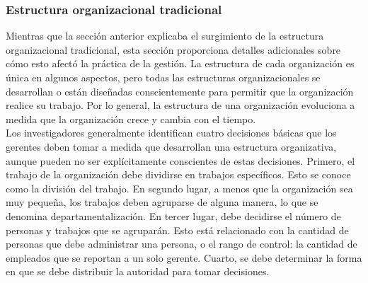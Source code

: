 \documentclass[10pt]{book}
\begin{document}
\subsubsection{Estructura organizacional tradicional}
Mientras que la sección anterior explicaba el surgimiento de la estructura organizacional tradicional, esta sección proporciona detalles adicionales sobre cómo esto afectó la práctica de la gestión. La estructura de cada organización es única en algunos aspectos, pero todas las estructuras organizacionales se desarrollan o están diseñadas conscientemente para permitir que la organización realice su trabajo. Por lo general, la estructura de una organización evoluciona a medida que la organización crece y cambia con el tiempo.\\
Los investigadores generalmente identifican cuatro decisiones básicas que los gerentes deben tomar a medida que desarrollan una estructura organizativa, aunque pueden no ser explícitamente conscientes de estas decisiones. Primero, el trabajo de la organización debe dividirse en trabajos específicos. Esto se conoce como la división del trabajo. En segundo lugar, a menos que la organización sea muy pequeña, los trabajos deben agruparse de alguna manera, lo que se denomina departamentalización. En tercer lugar, debe decidirse el número de personas y trabajos que se agruparán. Esto está relacionado con la cantidad de personas que debe administrar una persona, o el rango de control: la cantidad de empleados que se reportan a un solo gerente. Cuarto, se debe determinar la forma en que se debe distribuir la autoridad para tomar decisiones.\\
\end{document}
